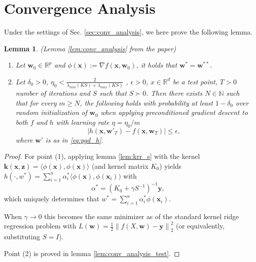 \documentclass[10pt]{article} %
\theoremstyle{plain}
\newtheorem{lemma}[theorem]{Lemma}
\theoremstyle{definition}
\theoremstyle{remark}
\newcommand{\Real}{\mathbb{R}}
\newcommand{\norm}[1]{\left\lVert#1\right\rVert}
\newcommand{\abs}[1]{\left|#1\right|}
\newcommand{\x}{\mathbf{x}}
\newcommand{\z}{\mathbf{z}}
\newcommand{\y}{\mathbf{y}}
\newcommand{\w}{\mathbf{w}}
\newcommand{\kr}{\boldsymbol{k}}
\begin{document}
\section{Convergence Analysis}\label{appendix:conv_analysis}
Under the settings of Sec. \ref{sec:conv_analysis}, we here prove the following lemma.
\begin{lemma} (Lemma \ref{lem:conv_analysis} from the paper)
    \begin{enumerate}
        \item Let $\w_0\in\Real^p$ and $\phi(\x):=\nabla f(\x,\w_0)$, it holds that $\w^*=\w^{**}$.
        \item Let $\delta_0 > 0$, $\eta_0 < \frac{2}{\lambda_{min}(KS)+\lambda_{max}(KS)}$ , $\epsilon>0$, $x\in\Real^d$ be a test point, $T>0$ number of iterations and $S$ such that $S\succ0$. Then there
        exists $N \in  \mathbb{N}$ such that for every $m \geq N$, the following holds with probability at least $1-\delta_0$ over random initialization of $\w_0$ when applying preconditioned gradient descent to both $f$ and $h$ with learning rate $\eta=\eta_0/m$ 
        \[
        \abs{h(\x,\w'_T)- f(\x,\w_T)} \leq \epsilon,
        \]
        where $\w'$ is as in \eqref{eq:pgd_h}.
    \end{enumerate}
\end{lemma}
\begin{proof}
For point (1), applying lemma \ref{lem:krr_s} with the kernel $\kr(\x,\z)=\langle \phi(\x), \phi(\x) \rangle$ (and kernel matrix $K_0$) yields $h(\cdot, w^*)=\sum_{i=1}^n\alpha^*_i\langle \phi(\x), \phi(\x_i))$ with     
\[
    \alpha^*=\left(K_0 + \gamma S^{-1}\right)^{-1}\y,
\]
which uniquely determines that $w^*=\sum_{i=1}^n\alpha^*_i\phi(\x_i)$.

When $\gamma\to 0$ this becomes the same minimizer as of the standard kernel ridge regression problem with $L(\w)=\frac{1}{2}\norm{f(X, \w)-\y}_2^2$ (or equivalently, substituting $S=I$).

Point (2) is proved in lemma \ref{lem:conv_analysis_test}.
\end{proof}
\end{document}
